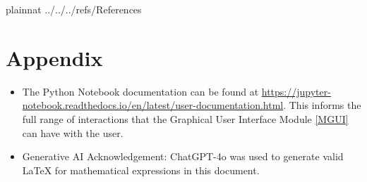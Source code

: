 \documentclass[12pt, titlepage]{article}
\begin{document}
\newpage

 {plainnat}
 {../../../refs/References}

\newpage

\section{Appendix} \label{Appendix}

\begin{itemize}
  \item The Python Notebook documentation can be found at
  \url{https://jupyter-notebook.readthedocs.io/en/latest/user-documentation.html}.
  This informs the full range of interactions that the Graphical User Interface
  Module \ref{MGUI} can have with the user.
  \item Generative AI Acknowledgement: ChatGPT-4o was used to generate valid
  LaTeX for mathematical expressions in this document.
\end{itemize}

\newpage{}
\end{document}
